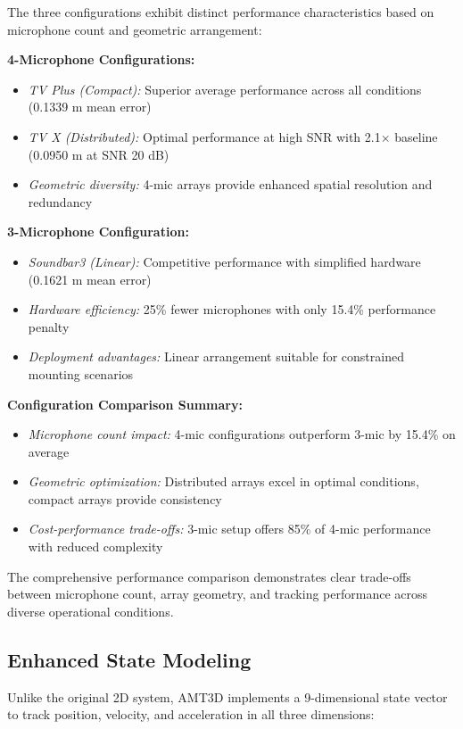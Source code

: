 \documentclass[a4paper]{article}
\begin{document}
The three configurations exhibit distinct performance characteristics based on microphone count and geometric arrangement:

{\bf 4-Microphone Configurations:}
\begin{itemize}
\item {\em TV Plus (Compact):} Superior average performance across all conditions (0.1339 m mean error)
\item {\em TV X (Distributed):} Optimal performance at high SNR with 2.1× baseline (0.0950 m at SNR 20 dB)
\item {\em Geometric diversity:} 4-mic arrays provide enhanced spatial resolution and redundancy
\end{itemize}

{\bf 3-Microphone Configuration:}
\begin{itemize}
\item {\em Soundbar3 (Linear):} Competitive performance with simplified hardware (0.1621 m mean error)
\item {\em Hardware efficiency:} 25\% fewer microphones with only 15.4\% performance penalty
\item {\em Deployment advantages:} Linear arrangement suitable for constrained mounting scenarios
\end{itemize}

{\bf Configuration Comparison Summary:}
\begin{itemize}
\item {\em Microphone count impact:} 4-mic configurations outperform 3-mic by 15.4\% on average
\item {\em Geometric optimization:} Distributed arrays excel in optimal conditions, compact arrays provide consistency
\item {\em Cost-performance trade-offs:} 3-mic setup offers 85\% of 4-mic performance with reduced complexity
\end{itemize}

The comprehensive performance comparison demonstrates clear trade-offs between microphone count, array geometry, and tracking performance across diverse operational conditions.

\subsection{Enhanced State Modeling}

Unlike the original 2D system, AMT3D implements a 9-dimensional state vector to track position, velocity, and acceleration in all three dimensions:
\end{document}
